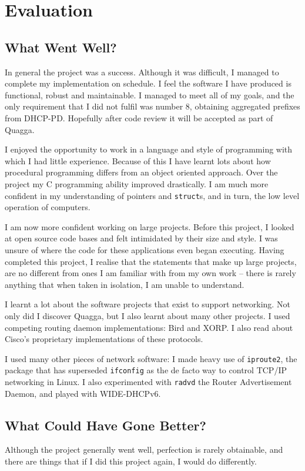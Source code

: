 \documentclass[12pt,a4paper,twoside]{report}
\begin{document}
\pagebreak

\chapter{Evaluation}

\section{What Went Well?}
In general the project was a success. Although it was difficult, I managed to
complete my implementation on schedule. I feel the software I have produced is
functional, robust and maintainable. I managed to meet all of my goals, and the
only requirement that I did not fulfil was number 8, obtaining aggregated
prefixes from DHCP-PD. Hopefully after code review it will be accepted as part
of Quagga.

I enjoyed the opportunity to work in a language and style of programming with
which I had little experience.  Because of this I have learnt lots about how
procedural programming differs from an object oriented approach. Over the
project my C programming ability improved drastically. I am much more confident
in my understanding of pointers and \texttt{struct}s, and in turn, the low
level operation of computers.  

I am now more confident working on large projects. Before this project, I
looked at open source code bases and felt intimidated by their size and style.
I was unsure of where the code for these applications even began executing.
Having completed this project, I realise that the statements that make up large
projects, are no different from ones I am familiar with from my own work --
there is rarely anything that when taken in isolation, I am unable to
understand.

I learnt a lot about the software projects that exist to support networking.
Not only did I discover Quagga, but I also learnt about many other projects. I
used competing routing daemon implementations: Bird and XORP\@. I also read
about Cisco's proprietary implementations of these protocols. 

I used many other pieces of network software: I made heavy use of
\texttt{iproute2}, the package that has superseded \texttt{ifconfig} as the de
facto way to control TCP/IP networking in Linux. I also experimented with
\texttt{radvd} the Router Advertisement Daemon, and played with WIDE-DHCPv6. 

\section{What Could Have Gone Better?}
Although the project generally went well, perfection is rarely obtainable, and
there are things that if I did this project again, I would do differently. 
\end{document}
